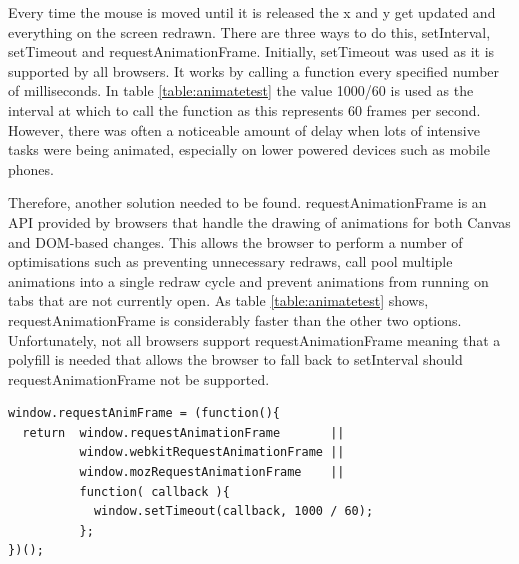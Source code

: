 \documentclass[12pt,a4paper]{report}
\begin{document}
Every time the mouse is moved until it is released the x and y get updated and everything on the screen redrawn. There are three ways to do this, setInterval, setTimeout and requestAnimationFrame. Initially, setTimeout was used as it is supported by all browsers. It works by calling a function every specified number of milliseconds. In table \ref{table:animatetest} the value 1000/60 is used as the interval at which to call the function as this represents 60 frames per second. However, there was often a noticeable amount of delay when lots of intensive tasks were being animated, especially on lower powered devices such as mobile phones.

Therefore, another solution needed to be found. requestAnimationFrame is an API provided by browsers that handle the drawing of animations for both Canvas and DOM-based changes. This allows the browser to perform a number of optimisations such as preventing unnecessary redraws, call pool multiple animations into a single redraw cycle and prevent animations from running on tabs that are not currently open. As table \ref{table:animatetest} shows, requestAnimationFrame is considerably faster than the other two options. Unfortunately, not all browsers support requestAnimationFrame meaning that a polyfill is needed that allows the browser to fall back to setInterval should requestAnimationFrame not be supported.

\begin{minipage}{\linewidth}
\begin{lstlisting}
window.requestAnimFrame = (function(){
  return  window.requestAnimationFrame       ||
          window.webkitRequestAnimationFrame ||
          window.mozRequestAnimationFrame    ||
          function( callback ){
            window.setTimeout(callback, 1000 / 60);
          };
})();
\end{lstlisting}
\end{minipage}
\end{document}
